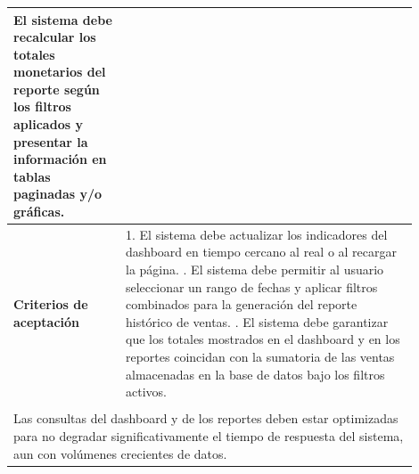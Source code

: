 \begin{longtable}{|p{0.25\linewidth}|p{0.15\linewidth}|p{0.15\linewidth}|p{0.35\linewidth}|}
{		El sistema debe recalcular los totales monetarios del reporte según los filtros aplicados y presentar la información en tablas paginadas y/o gráficas.}                                                        \\ \hline
		\cellcolor{tableheaderblue}\textbf{Criterios de aceptación} & \multicolumn{3}{p{0.70\linewidth}|}{                                                                                                             %
			1. El sistema debe actualizar los indicadores del dashboard en tiempo cercano al real o al recargar la página. \newline
			2. El sistema debe permitir al usuario seleccionar un rango de fechas y aplicar filtros combinados para la generación del reporte histórico de ventas. \newline
		3. El sistema debe garantizar que los totales mostrados en el dashboard y en los reportes coincidan con la sumatoria de las ventas almacenadas en la base de datos bajo los filtros activos.}                  \\ \hline
		\rowcolor{tableheaderblue}
		\multicolumn{4}{|l|}{\textbf{Restricciones}}                                                                                                                                                                   \\ \hline
		\multicolumn{4}{|p{0.96\linewidth}|}{%
		Las consultas del dashboard y de los reportes deben estar optimizadas para no degradar significativamente el tiempo de respuesta del sistema, aun con volúmenes crecientes de datos.}                          \\ \hline
	
\end{longtable}
\endgroup


